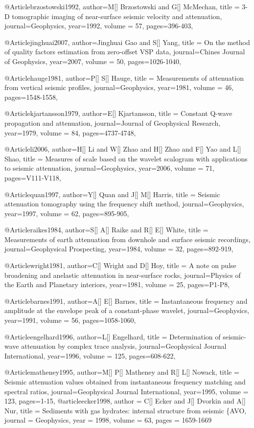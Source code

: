 {@Article{brzostowski1992,
  author={M[] Brzostowski and G[] McMechan},
  title = {3-{D} tomographic imaging of near-surface seismic velocity and attenuation},
  journal={Geophysics},
  year=1992,
  volume = 57,
  pages={396-403},
}

@Article{jinghuai2007,
  author={Jinghuai Gao and S[] Yang},
  title = {On the method of quality factors estimation from zero-offset VSP data},
  journal={Chines Journal of Geophysics},
  year=2007,
  volume = 50,
  pages={1026-1040},
}

@Article{hauge1981,
  author={P[] S[] Hauge},
  title = {Measurements of attenuation from vertical seismic profiles},
  journal={Geophysics},
  year=1981,
  volume = 46,
  pages={1548-1558},
}

@Article{kjartansson1979,
  author={E[] Kjartansson},
  title = {Constant Q-wave propagation and attenuation},
  journal={Journal of Geophysical Research},
  year=1979,
  volume = 84,
  pages={4737-4748},
}

@Article{li2006,
  author={H[] Li and W[] Zhao and H[] Zhao and F[] Yao and L[] Shao},
  title = {Measures of scale based on the wavelet scalogram with applications to seismic attenuation},
  journal={Geophysics},
  year=2006,
  volume = 71,
  pages={V111-V118},
}

@Article{quan1997,
  author={Y[] Quan and J[] M[] Harris},
  title = {Seismic attenuation tomography using the frequency shift method},
  journal={Geophysics},
  year=1997,
  volume = 62,
  pages={895-905},
}

@Article{raikes1984,
  author={S[] A[] Raike and R[] E[] White},
  title = {Measurements of earth attenuation from downhole and surface seismic recordings},
  journal={Geophysical Prospecting},
  year=1984,
  volume = 32,
  pages={892-919},
}

@Article{wright1981,
  author={C[] Wright and D[] Hoy},
  title = {A note on pulse broadening and anelastic attenuation in near-surface rocks},
  journal={Physics of the Earth and Planetary interiors},
  year=1981,
  volume = 25,
  pages={P1-P8},
}

@Article{barnes1991,
  author={A[] E[] Barnes},
  title = {Instantaneous frequency and amplitude at the envelope peak of a constant-phase wavelet},
  journal={Geophysics},
  year=1991,
  volume = 56,
  pages={1058-1060},
}

@Article{engelhard1996,
  author={L[] Engelhard},
  title = {Determination of seismic-wave attenuation by complex trace analysis},
  journal={Geophysical Journal International},
  year=1996,
  volume = 125,
  pages={608-622},
}

@Article{matheney1995,
  author={M[] P[] Matheney and R[] L[] Nowack},
  title = {Seismic attenuation values obtained from instantaneous frequency matching and spectral ratios},
  journal={Geophysical Journal International},
  year=1995,
  volume = 123,
  pages={1-15},
}
@article{ecker1998,
  author = {C[] Ecker and J[] Dvorkin and A[] Nur},
  title = {Sediments with gas hydrates: internal structure from seismic \{AVO}},
  journal = {Geophysics},
  year = {1998},
  volume = {63},
  pages = {1659-1669}
}

